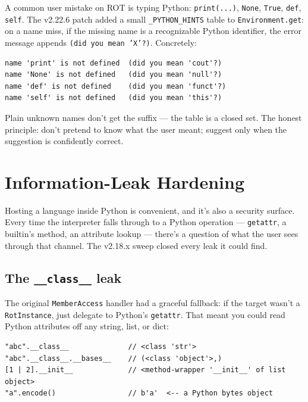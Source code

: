 \documentclass[11pt]{article}
\begin{document}
A common user mistake on ROT is typing Python: \texttt{print(...)}, \texttt{None}, \texttt{True}, \texttt{def}, \texttt{self}. The v2.22.6 patch added a small \texttt{\_PYTHON\_HINTS} table to \texttt{Environment.get}: on a name miss, if the missing name is a recognizable Python identifier, the error message appends \texttt{(did you mean 'X'?)}. Concretely:

\begin{lstlisting}[style=plainstyle, basicstyle=\ttfamily\footnotesize]
name 'print' is not defined  (did you mean 'cout'?)
name 'None' is not defined   (did you mean 'null'?)
name 'def' is not defined    (did you mean 'funct'?)
name 'self' is not defined   (did you mean 'this'?)
\end{lstlisting}

Plain unknown names don't get the suffix --- the table is a closed set. The honest principle: don't pretend to know what the user meant; suggest only when the suggestion is confidently correct.

\section{Information-Leak Hardening}

Hosting a language inside Python is convenient, and it's also a security surface. Every time the interpreter falls through to a Python operation --- \texttt{getattr}, a builtin's method, an attribute lookup --- there's a question of what the user sees through that channel. The v2.18.x sweep closed every leak it could find.

\subsection{The \texttt{\_\_class\_\_} leak}

The original \texttt{MemberAccess} handler had a graceful fallback: if the target wasn't a \texttt{RotInstance}, just delegate to Python's \texttt{getattr}. That meant you could read Python attributes off any string, list, or dict:

\begin{lstlisting}[style=rotstyle]
"abc".__class__              // <class 'str'>
"abc".__class__.__bases__    // (<class 'object'>,)
[1 | 2].__init__             // <method-wrapper '__init__' of list object>
"a".encode()                 // b'a'  <-- a Python bytes object
\end{lstlisting}
\end{document}
